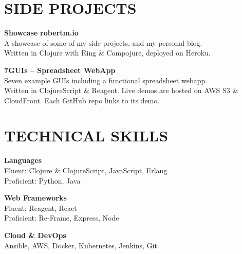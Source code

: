 \documentclass[line,margin]{res}
\begin{document}
\begin{resume}
\section{SIDE PROJECTS}
    \begin{description}
        \item \textbf{Showcase} \hfill \textbf{robertm.io} \\
          A showcase of some of my side projects, and my personal blog. \\
          Written in Clojure with Ring \& Compojure, deployed on Heroku.

        \item \textbf{7GUIs -- Spreadsheet WebApp} \hfill \textbf \\
          Seven example GUIs including a functional spreadsheet webapp. \\
          Written in ClojureScript \& Reagent. Live demos are hosted
          on AWS S3 \& CloudFront. Each GitHub repo links to its demo.
    \end{description}


\section{TECHNICAL SKILLS}
    \begin{description}
        \item \textbf{Languages} \hfill \\
          Fluent: Clojure \& ClojureScript, JavaScript, Erlang \\
          Proficient: Python, Java
        \item \textbf{Web Frameworks} \hfill \\
          Fluent: Reagent, React \\
          Proficient: Re-Frame, Express, Node
        \item \textbf{Cloud \& DevOps} \hfill \\
          Ansible, AWS, Docker, Kubernetes, Jenkins, Git
    \end{description}

\end{resume}
\end{document}
